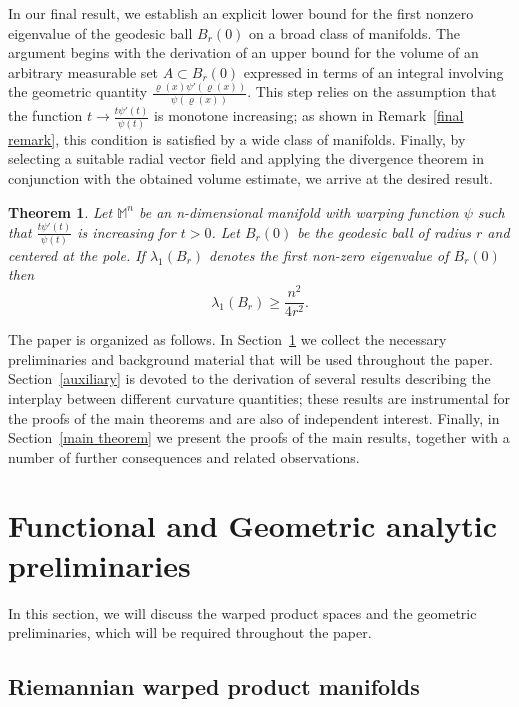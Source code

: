 \documentclass[a4paper,11pt,reqno]{amsart}
\theoremstyle{plain}
\newtheorem{theorem}{Theorem}[section]
\numberwithin{equation}{section} \allowdisplaybreaks
\newcommand{\m}{\mathbb{M}^n}
\begin{document}
In our final result,  we establish an explicit lower bound for the first nonzero eigenvalue of the geodesic ball $B_r(0)$ on a broad class of manifolds. The argument begins with the derivation of an upper bound for the volume of an arbitrary measurable set $A\subset B_r(0)$ expressed in terms of an integral involving the geometric quantity $\frac{\varrho(x)\psi'(\varrho(x))}{\psi(\varrho(x))}$. This step relies on the assumption that the function $t\to \frac{t\psi'(t)}{\psi(t)}$ is monotone increasing; as shown in Remark~\ref{final remark}, this condition is satisfied by a wide class of manifolds. Finally, by selecting a suitable radial vector field and applying the divergence theorem in conjunction with the obtained volume estimate, we arrive at the desired result.

\begin{theorem}\label{fifth}
    Let $\m$ be an n-dimensional manifold with warping function $\psi$ such that $\frac{t\psi'(t)}{\psi(t)}$ is increasing for $t>0$. Let $B_r(0)$ be the geodesic ball of radius $r$ and centered at the pole. If $\lambda_1(B_r)$ denotes the first non-zero eigenvalue of $B_r(0)$ then
    \begin{equation*} 
        \lambda_1(B_r) \geq \frac{n^2}{4r^2}.
    \end{equation*}
\end{theorem}

\medskip

The paper is organized as follows. In Section~\ref{prem} we collect the necessary preliminaries and background material that will be used throughout the paper. Section~\ref{auxiliary} is devoted to the derivation of several results describing the interplay between different curvature quantities; these results are instrumental for the proofs of the main theorems and are also of independent interest. Finally, in Section~\ref{main theorem} we present the proofs of the main results, together with a number of further consequences and related observations.

\medskip

\section{Functional and Geometric analytic preliminaries} \label{prem}
In this section, we will discuss the warped product spaces and the geometric preliminaries, which will be required throughout the paper.
\medskip

\subsection{Riemannian warped product manifolds}
\end{document}
